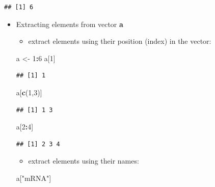 \documentclass[]{book}
\newenvironment{Shaded}{\begin{snugshade}}{\end{snugshade}}
\newcommand{\DecValTok}[1]{\textcolor[rgb]{0.00,0.00,0.81}{#1}}
\newcommand{\KeywordTok}[1]{\textcolor[rgb]{0.13,0.29,0.53}{\textbf{#1}}}
\newcommand{\NormalTok}[1]{#1}
\newcommand{\OperatorTok}[1]{\textcolor[rgb]{0.81,0.36,0.00}{\textbf{#1}}}
\newcommand{\StringTok}[1]{\textcolor[rgb]{0.31,0.60,0.02}{#1}}
\providecommand{\tightlist}{%
  \setlength{\itemsep}{0pt}\setlength{\parskip}{0pt}}
\begin{document}
\begin{verbatim}
## [1] 6
\end{verbatim}

\begin{itemize}
\tightlist
\item
  Extracting elements from vector \textbf{a}

  \begin{itemize}
  \tightlist
  \item
    extract elements using their position (index) in the vector:
  \end{itemize}

\begin{Shaded}
\begin{Highlighting}[]
\NormalTok{a <-}\StringTok{ }\DecValTok{1}\OperatorTok{:}\DecValTok{6}
\NormalTok{a[}\DecValTok{1}\NormalTok{]}
\end{Highlighting}
\end{Shaded}

\begin{verbatim}
## [1] 1
\end{verbatim}

\begin{Shaded}
\begin{Highlighting}[]
\NormalTok{a[}\KeywordTok{c}\NormalTok{(}\DecValTok{1}\NormalTok{,}\DecValTok{3}\NormalTok{)]}
\end{Highlighting}
\end{Shaded}

\begin{verbatim}
## [1] 1 3
\end{verbatim}

\begin{Shaded}
\begin{Highlighting}[]
\NormalTok{a[}\DecValTok{2}\OperatorTok{:}\DecValTok{4}\NormalTok{]}
\end{Highlighting}
\end{Shaded}

\begin{verbatim}
## [1] 2 3 4
\end{verbatim}

  \begin{itemize}
  \tightlist
  \item
    extract elements using their names:
  \end{itemize}

\begin{Shaded}
\begin{Highlighting}[]
\NormalTok{a[}\StringTok{"mRNA"}\NormalTok{]}
\end{Highlighting}
\end{Shaded}


\end{itemize}
\end{document}
